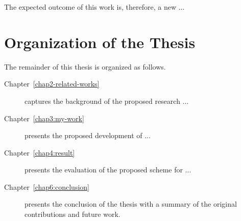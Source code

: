 \vspace{-.75em} 
The expected outcome of this work is, therefore, a new ...
	



\section{Organization of the Thesis}
\label{sec:ThesisStructure}
The remainder of this thesis is organized as follows. 
%
\begin{description}
%	
\item[Chapter~\ref{chap2-related-works}] 
captures the background of the proposed research ...
	
\item[Chapter~\ref{chap3:my-work}]  
presents the proposed development of ...

\item[Chapter~\ref{chap4:result}] 
presents the evaluation of the proposed scheme for ...
	
\item[Chapter~\ref{chap6:conclusion}]  
presents the conclusion of the thesis with a summary of the original contributions and future work.

\end{description}



 

 


